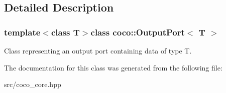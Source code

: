 \subsection{Detailed Description}
\subsubsection*{template$<$class T$>$class coco\+::\+Output\+Port$<$ T $>$}

Class representing an output port containing data of type T. 

The documentation for this class was generated from the following file\+:\begin{DoxyCompactItemize}
\item 
src/coco\+\_\+core.\+hpp\end{DoxyCompactItemize}
